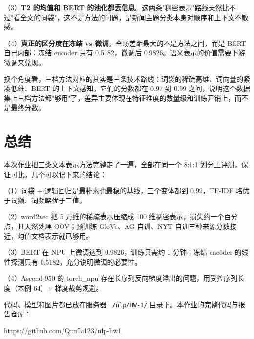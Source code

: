 \documentclass[UTF8,a4paper,10pt]{ctexart}
\begin{document}
（3）\textbf{T2 的均值和 BERT 的池化都丢信息}。这两条"稠密表示"路线天然比不过"看全文的词袋"，这不是方法的问题，是新闻主题分类本身对顺序和上下文不敏感。

（4）\textbf{真正的区分度在冻结 vs 微调}。全场差距最大的不是方法之间，而是 BERT 自己内部：冻结 encoder 只有 0.5182，微调后 0.9826。语义表示的价值需要下游微调来兑现。

换个角度看，三档方法对应的其实是三条技术路线：词袋的稀疏高维、词向量的紧凑低维、BERT 的上下文感知。它们的分数都在 0.97 到 0.99 之间，说明这个数据集上三档方法都"够用"了，差异主要体现在特征维度的数量级和训练开销上，而不是最终分数。

\section{总结}

本次作业把三类文本表示方法完整走了一遍，全部在同一个 8:1:1 划分上评测，保证可比。几个可以记下来的结论：

（1）词袋 + 逻辑回归是最朴素也最稳的基线，三个变体都到 0.99，TF-IDF 略优于词频、词频略优于二值。

（2）word2vec 把 5 万维的稀疏表示压缩成 100 维稠密表示，损失约一个百分点，且天然处理 OOV；预训练 GloVe、AG 自训、NYT 自训三种来源分数接近，均值文档表示就已够用。

（3）BERT 在 NPU 上微调达到 0.9826，训练只需约 1 分钟；冻结 encoder 的线性探测只有 0.5182，充分说明微调的必要性。

（4）Ascend 950 的 torch\_npu 存在长序列反向梯度溢出的问题，用受控序列长度（本例 64）+ 梯度裁剪规避。

代码、模型和图片都已放在服务器 \texttt{~/nlp/HW-1/} 目录下。本作业的完整代码与报告仓库：

\begin{center}
\url{https://github.com/QunLi123/nlp-hw1}
\end{center}
\end{document}
